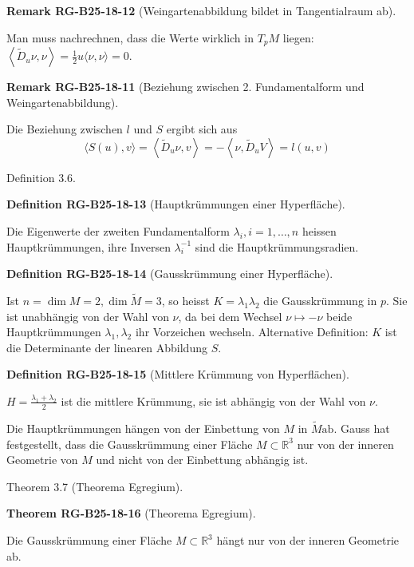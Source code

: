 \documentclass[10pt, letterpaper]{article}
\newcommand{\CustomHeading}[3]{%
  \par\medskip\noindent%
  \textbf{#1 #2} \textnormal{(#3)}.\enskip%
}
\newenvironment{DEF}[2]{\begin{unitbox}\CustomHeading{Definition}{#1}{#2}}{\end{unitbox}}
\newenvironment{THEO}[2]{\begin{unitbox}\CustomHeading{Theorem}{#1}{#2}}{\end{unitbox}}
\newenvironment{REM}[2]{\begin{unitbox}\CustomHeading{Remark}{#1}{#2}}{\end{unitbox}}
\begin{document}
\begin{REM}{RG-B25-18-12}{Weingartenabbildung bildet in Tangentialraum ab}
Man muss nachrechnen, dass die Werte wirklich in $T_{p} M$ liegen: $\left\langle\tilde{D}_{u} \nu, \nu\right\rangle=\frac{1}{2} u\langle\nu, \nu\rangle=0$.
\end{REM}

\begin{REM}{RG-B25-18-11}{Beziehung zwischen 2. Fundamentalform und Weingartenabbildung}
Die Beziehung zwischen $l$ und $S$ ergibt sich aus
$$
\langle S(u), v\rangle=\left\langle\tilde{D}_{u} \nu, v\right\rangle=-\left\langle\nu, \tilde{D}_{u} V\right\rangle=l(u, v)
$$
\end{REM}

Definition 3.6.

\begin{DEF}{RG-B25-18-13}{Hauptkrümmungen einer Hyperfläche}
Die Eigenwerte der zweiten Fundamentalform $\lambda_{i}, i=1, \ldots, n$ heissen Hauptkrümmungen, ihre Inversen $\lambda_{i}^{-1}$ sind die Hauptkrümmungsradien.
\end{DEF}


\begin{DEF}{RG-B25-18-14}{Gausskrümmung einer Hyperfläche}
Ist $n=\operatorname{dim} M=2, \operatorname{dim} \tilde{M}=3$, so heisst $K=\lambda_{1} \lambda_{2}$ die Gausskrümmung in $p$. Sie ist unabhängig von der Wahl von $\nu$, da bei dem Wechsel $\nu \mapsto-\nu$ beide Hauptkrümmungen $\lambda_{1}, \lambda_{2}$ ihr Vorzeichen wechseln. Alternative Definition: $K$ ist die Determinante der linearen Abbildung $S$.
\end{DEF}


\begin{DEF}{RG-B25-18-15}{Mittlere Krümmung von Hyperflächen}
$H=\frac{\lambda_{1}+\lambda_{2}}{2}$ ist die mittlere Krümmung, sie ist abhängig von der Wahl von $\nu$.
\end{DEF}


Die Hauptkrümmungen hängen von der Einbettung von $M$ in $\tilde{M} \mathrm{ab}$. Gauss hat festgestellt, dass die Gausskrümmung einer Fläche $M \subset \mathbb{R}^{3}$ nur von der inneren Geometrie von $M$ und nicht von der Einbettung abhängig ist.

Theorem 3.7 (Theorema Egregium). 


\begin{THEO}{RG-B25-18-16}{Theorema Egregium}
Die Gausskrümmung einer Fläche $M \subset \mathbb{R}^{3}$ hängt nur von der inneren Geometrie ab.
\end{THEO}
\end{document}
